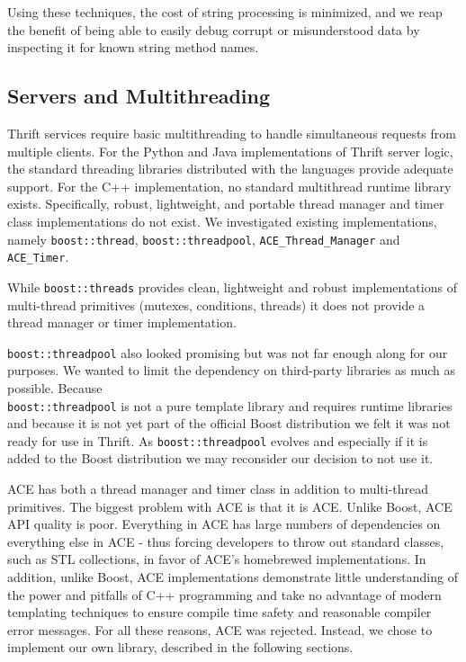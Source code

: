 \documentclass[nocopyrightspace,blockstyle]{sigplanconf}
\begin{document}
Using these techniques, the cost of string processing is minimized, and we
reap the benefit of being able to easily debug corrupt or misunderstood data by
inspecting it for known string method names.

\subsection{Servers and Multithreading}
Thrift services require basic multithreading to handle simultaneous
requests from multiple clients. For the Python and Java implementations of
Thrift server logic, the standard threading libraries distributed with the
languages provide adequate support. For the C++ implementation, no standard multithread runtime
library exists. Specifically, robust, lightweight, and portable
thread manager and timer class implementations do not exist. We investigated
existing implementations, namely \texttt{boost::thread},
\texttt{boost::threadpool}, \texttt{ACE\_Thread\_Manager} and
\texttt{ACE\_Timer}.

While \texttt{boost::threads}\cite{boost.threads}  provides clean,
lightweight and robust implementations of multi-thread primitives (mutexes,
conditions, threads) it does not provide a thread manager or timer
implementation.

\texttt{boost::threadpool}\cite{boost.threadpool} also looked promising but
was not far enough along for our purposes. We wanted to limit the dependency on
third-party libraries as much as possible. Because\\
\texttt{boost::threadpool} is
not a pure template library and requires runtime libraries and because it is
not yet part of the official Boost distribution we felt it was not ready for
use in Thrift. As \texttt{boost::threadpool} evolves and especially if it is
added to the Boost distribution we may reconsider our decision to not use it.

ACE has both a thread manager and timer class in addition to multi-thread
primitives. The biggest problem with ACE is that it is ACE. Unlike Boost, ACE
API quality is poor. Everything in ACE has large numbers of dependencies on
everything else in ACE - thus forcing developers to throw out standard
classes, such as STL collections, in favor of ACE's homebrewed implementations. In
addition, unlike Boost, ACE implementations demonstrate little understanding
of the power and pitfalls of C++ programming and take no advantage of modern
templating techniques to ensure compile time safety and reasonable compiler
error messages. For all these reasons, ACE was rejected. Instead, we chose
to implement our own library, described in the following sections.
\end{document}
